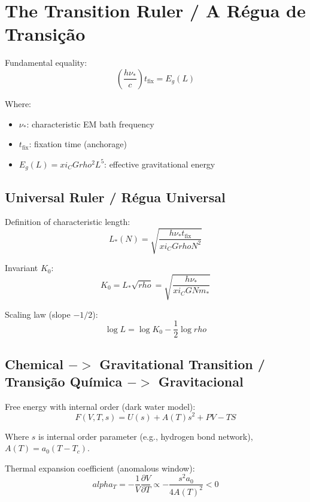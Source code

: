 \documentclass[12pt,a4paper]{article}
\def\to{ -> }%
\def\alpha{alpha}%
\def\xi{xi}%
\def\rho{rho}%
\begin{document}
\section{The Transition Ruler / A Régua de Transição}

Fundamental equality:
\begin{equation}
\left(\frac{h\nu_*}{c}\right)t_{\text{fix}} = E_g(L)
\end{equation}

Where:
\begin{itemize}
    \item $\nu_*$: characteristic EM bath frequency
    \item $t_{\text{fix}}$: fixation time (anchorage)
    \item $E_g(L) = \xi_C G\rho^2 L^5$: effective gravitational energy
\end{itemize}

\subsection{Universal Ruler / Régua Universal}

Definition of characteristic length:
\begin{equation}
L_*(N) = \sqrt{\frac{h\nu_*t_{\text{fix}}}{\xi_C G\rho N^2}}
\end{equation}

Invariant $K_0$:
\begin{equation}
\boxed{K_0 = L_*\sqrt{\rho} = \sqrt{\frac{h\nu_*}{\xi_C G N m_*}}}
\end{equation}

Scaling law (slope $-1/2$):
\begin{equation}
\log L = \log K_0 - \frac{1}{2}\log\rho
\end{equation}

\subsection{Chemical $\to$ Gravitational Transition / Transição Química $\to$ Gravitacional}

Free energy with internal order (dark water model):
\begin{equation}
F(V,T,s) = U(s) + A(T)s^2 + PV - TS
\end{equation}

Where $s$ is internal order parameter (e.g., hydrogen bond network), $A(T) = a_0(T - T_c)$.

Thermal expansion coefficient (anomalous window):
\begin{equation}
\alpha_T = -\frac{1}{V}\frac{\partial V}{\partial T} \propto -\frac{s^2a_0}{4A(T)^2} < 0
\end{equation}
\end{document}
